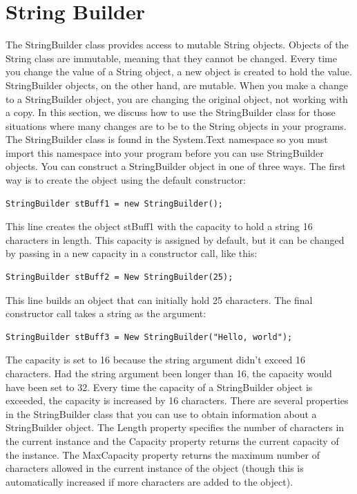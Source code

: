 \documentclass[12pt,a4paper,final,twoside,titlepage]{book}
\begin{document}
\section{String Builder}
The StringBuilder class provides access to mutable String objects. Objects of the String class are immutable, meaning that they cannot be changed. Every time you change the value of a String object, a new object is created to hold the value. StringBuilder objects, on the other hand, are mutable. When you make a change to a StringBuilder object, you are changing the original object, not working with a copy. In this section, we discuss how to use the StringBuilder class for those situations where many changes are to be to the String objects in your programs. The StringBuilder class is found in the System.Text namespace so you must import this namespace into your program before you can use StringBuilder objects.
You can construct a StringBuilder object in one of three ways. The first way is to create the object using the default constructor:
\begin{lstlisting}
StringBuilder stBuff1 = new StringBuilder();
\end{lstlisting}
This line creates the object stBuff1 with the capacity to hold a string 16 characters in length. This capacity is assigned by default, but it can be changed by passing in a new capacity in a constructor call, like this:
\begin{lstlisting}
StringBuilder stBuff2 = New StringBuilder(25);
\end{lstlisting}
This line builds an object that can initially hold 25 characters. The final constructor call takes a string as the argument:
\begin{lstlisting}
StringBuilder stBuff3 = New StringBuilder("Hello, world");
\end{lstlisting}
The capacity is set to 16 because the string argument didn’t exceed 16 characters. Had the string argument been longer than 16, the capacity would have been set to 32. Every time the capacity of a StringBuilder object is exceeded, the capacity is increased by 16 characters.
There are several properties in the StringBuilder class that you can use to obtain information about a StringBuilder object. The Length property specifies the number of characters in the current instance and the Capacity property returns the current capacity of the instance. The MaxCapacity property returns the maximum number of characters allowed in the current instance of the object (though this is automatically increased if more characters are added to the object).
\end{document}
